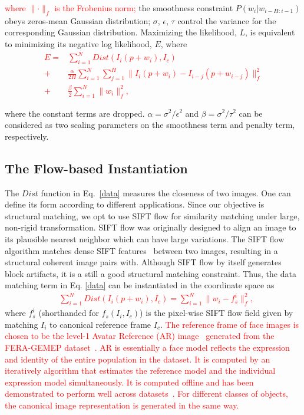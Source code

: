 \documentclass[10pt,journal]{IEEEtran}
\newcommand{\Songfan}[1]{\textcolor{red}{#1}}
\begin{document}
\noindent \Songfan{where $\parallel \cdot \parallel_f$ is the Frobenius norm;} the smoothness constraint $P(w_i|w_{i-H:i-1})$ obeys zeros-mean Gaussian distribution; $\sigma$, $\epsilon$, $\tau$ control the variance for the corresponding Gaussian distribution. Maximizing the likelihood, $L$, is equivalent to minimizing its negative log likelihood, $E$, where
\Songfan{
\begin{align}
\label{data}
E = &\sum_{i=1}^{N}Dist(I_i(p+w_i),I_c) \\
\label{smooth}
	+ &\frac{\alpha}{2H}\sum_{i=1}^{N}\sum_{j=1}^{H}\parallel{I_i(p+w_i)-I_{i-j}(p+w_{i-j})}\parallel_f^2 \\
\label{penalty}
	+ &\frac{\beta}{2}\sum_{i=1}^{N}\parallel{w_i}\parallel_f^2,
\end{align}
}

\noindent where the constant terms are dropped. $\alpha=\sigma^2 / \epsilon^2$ and $\beta=\sigma^2 / \tau^2$ can be considered as two scaling parameters on the smoothness term and penalty term, respectively. 

\subsection{\label{sec:model}The Flow-based Instantiation}

The $Dist$ function in Eq.~\ref{data} measures the closeness of two images. One can define its form according to different applications. Since our objective is structural matching, we opt to use SIFT flow \cite{Liu_PAMI11} for similarity matching under large, non-rigid transformation. SIFT flow \cite{Liu_PAMI11} was originally designed to align an image to its plausible nearest neighbor which can have large variations. The SIFT flow algorithm matches dense SIFT features~\cite{SIFT} between two images, resulting in a structural coherent image pairs with. Although SIFT flow by itself generates block artifacts, it is a still a good structural matching constraint. Thus, the data matching term in Eq. \ref{data} can be instantiated in the coordinate space as
\Songfan{
\begin{align}
\label{data_sift}
&\sum_{i=1}^{N}Dist(I_i(p+w_i),I_c)=\sum_{i=1}^{N}\parallel{w_i-f_s^i}\parallel_f^2,
\end{align}
}
\noindent where $f_s^i$ (shorthanded for $f_s(I_i,I_c)$) is the pixel-wise SIFT flow field given by matching $I_i$ to canonical reference frame $I_c$. \Songfan{The reference frame of face images is chosen to be the level-1 Avatar Reference (AR) image~\cite{Yang_SMCB12} generated from the FERA-GEMEP dataset~\cite{Valstar_FERA11}. AR is essentially a face model reflects the expression and identity of the entire population in the dataset. It is computed by an iteratively algorithm that estimates the reference model and the individual expression model simultaneously. It is computed offline and has been demonstrated to perform well across datasets~\cite{Yang_SMCB12}. For different classes of objects, the canonical image representation is generated in the same way. }
\end{document}
